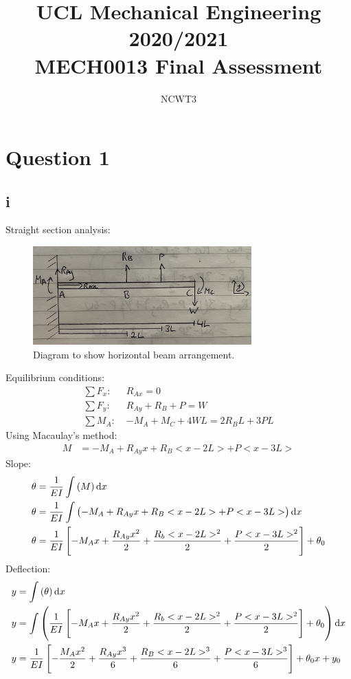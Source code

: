 \documentclass[11pt]{article}
\numberwithin{equation}{section}
\begin{document}
\title{\textbf{UCL Mechanical Engineering 2020/2021}\\MECH0013 Final Assessment}
\author{NCWT3}
\maketitle
\tableofcontents
\listoffigures
\section{Question 1}
\subsection{i}
Straight section analysis:
\begin{figure}[H]
    \centering
    \includegraphics[width = 0.75\textwidth]{./img/q1i.jpg}
    \caption{Diagram to show horizontal beam arrangement.}
    \label{fig:q1i}
\end{figure}
Equilibrium conditions:
\begin{align}
    \sum F_x: \; &R_{Ax} = 0\\
    \sum F_y: \; &R_{Ay} + R_B + P = W \label{q1isumy}\\
    \sum M_A: \; &-M_A + M_C + 4WL = 2R_B L + 3PL \label{q1isumM}
\end{align}
Using Macaulay's method:
\begin{align}
    M &= -M_A + R_{Ay}x + R_B <x- 2L> + P<x-3L> \label{eq:q1i1}
\end{align}
Slope:
\begin{align}
    \theta &= \frac{1}{EI} \int \left(M\right)\dif x\\
    \theta &= \frac{1}{EI} \int \left(-M_A + R_{Ay}x + R_B <x- 2L> + P<x-3L>\right) \dif x\\
    \theta &= \frac{1}{EI} \left[-M_A x + \frac{R_{Ay}x^2}{2} + \frac{R_b<x - 2L>^2}{2} + \frac{P<x-3L>^2}{2}\right] + \theta_0
\end{align}
Deflection:
\begin{align}
    y &= \int \left(\theta\right) \dif x\\
    y &= \int \left(\frac{1}{EI} \left[-M_A x + \frac{R_{Ay}x^2}{2} + \frac{R_b<x - 2L>^2}{2} + \frac{P<x-3L>^2}{2}\right] + \theta_0\right) \dif x\\
    y &= \frac{1}{EI} \left[-\frac{M_A x^2}{2} + \frac{R_{Ay}x^3}{6} + \frac{R_B<x- 2L>^3}{6} + \frac{P<x-3L>^3}{6}\right] + \theta_0 x +y_0 \label{eq:slope}
\end{align}
\end{document}
